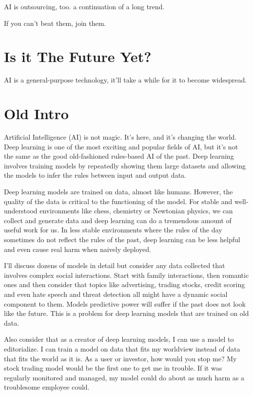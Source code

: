 AI is outsourcing, too. a continuation of a long trend.

If you can't beat them, join them.

\section{Is it The Future Yet?}

AI is a general-purpose technology, it'll take a while for it to become widespread.

\section{Old Intro}

Artificial Intelligence (AI) is not magic. It's here, and it's changing the world. Deep learning is one of the most exciting and popular fields of AI, but it's not the same as the good old-fashioned rules-based AI of the past. Deep learning involves training models by repeatedly showing them large datasets and allowing the models to infer the rules between input and output data.

Deep learning models are trained on data, almost like humans. However, the quality of the data is critical to the functioning of the model. For stable and well-understood environments like chess, chemistry or Newtonian physics, we can collect and generate data and deep learning can do a tremendous amount of useful work for us. In less stable environments where the rules of the day sometimes do not reflect the rules of the past, deep learning can be less helpful and even cause real harm when naively deployed. 

I'll discuss dozens of models in detail but consider any data collected that involves complex social interactions. Start with family interactions, then romantic ones and then consider that topics like advertising, trading stocks, credit scoring and even hate speech and threat detection all might have a dynamic social component to them. Models predictive power will suffer if the past does not look like the future. This is a problem for deep learning models that are trained on old data.

Also consider that as a creator of deep learning models, I can use a model to editorialize. I can train a model on data that fits my worldview instead of data that fits the world as it is. As a user or investor, how would you stop me? My stock trading model would be the first one to get me in trouble. If it was regularly monitored and managed, my model could do about as much harm as a troublesome employee could. 

